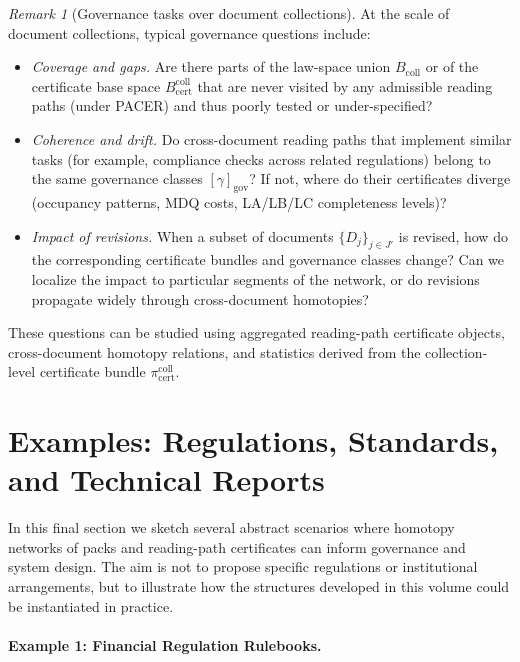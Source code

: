 \documentclass[11pt]{book}
\theoremstyle{plain}
\theoremstyle{definition}
\theoremstyle{remark}
\newtheorem{remark}[theorem]{Remark}
\begin{document}
\begin{remark}[Governance tasks over document collections]
\label{rem:governance-tasks-collections}
At the scale of document collections, typical governance questions
include:
\begin{itemize}
  \item \emph{Coverage and gaps.} Are there parts of the law-space
        union $B_{\mathrm{coll}}$ or of the certificate base space
        $B_{\mathrm{cert}}^{\mathrm{coll}}$ that are never visited by
        any admissible reading paths (under PACER) and thus poorly
        tested or under-specified?
  \item \emph{Coherence and drift.} Do cross-document reading paths
        that implement similar tasks (for example, compliance checks
        across related regulations) belong to the same governance
        classes $[\gamma]_{\mathrm{gov}}$? If not, where do their
        certificates diverge (occupancy patterns, MDQ costs, LA/LB/LC
        completeness levels)?
  \item \emph{Impact of revisions.} When a subset of documents
        $\{D_j\}_{j\in J'}$ is revised, how do the corresponding
        certificate bundles and governance classes change? Can we
        localize the impact to particular segments of the network,
        or do revisions propagate widely through cross-document
        homotopies?
\end{itemize}
These questions can be studied using aggregated reading-path certificate
objects, \\cross-document homotopy relations, and statistics derived from
the collection-level certificate bundle
$\pi_{\mathrm{cert}}^{\mathrm{coll}}$.
\end{remark}



\section[Examples: Regulations, Standards, and Technical Reports]{Examples: Regulations, Standards, and Technical Reports}


In this final section we sketch several abstract scenarios where
homotopy networks of packs and reading-path certificates can inform
governance and system design. The aim is not to propose specific
regulations or institutional arrangements, but to illustrate how the
structures developed in this volume could be instantiated in practice.

\paragraph{Example 1: Financial Regulation Rulebooks.}
\end{document}
